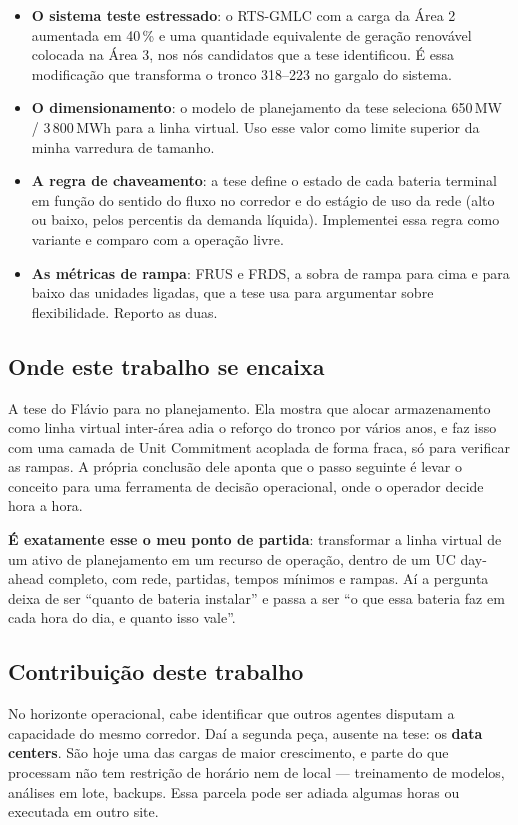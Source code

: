 \documentclass[11pt,a4paper]{article}
\begin{document}
\begin{itemize}
\item \textbf{O sistema teste estressado}: o RTS-GMLC com a carga da Área 2 aumentada em 40\,\% e uma
quantidade equivalente de geração renovável colocada na Área 3, nos nós candidatos que a tese identificou.
É essa modificação que transforma o tronco 318--223 no gargalo do sistema.
\item \textbf{O dimensionamento}: o modelo de planejamento da tese seleciona 650\,MW / 3\,800\,MWh para a
linha virtual. Uso esse valor como limite superior da minha varredura de tamanho.
\item \textbf{A regra de chaveamento}: a tese define o estado de cada bateria terminal em função do
sentido do fluxo no corredor e do estágio de uso da rede (alto ou baixo, pelos percentis da demanda
líquida). Implementei essa regra como variante e comparo com a operação livre.
\item \textbf{As métricas de rampa}: FRUS e FRDS, a sobra de rampa para cima e para baixo das unidades
ligadas, que a tese usa para argumentar sobre flexibilidade. Reporto as duas.
\end{itemize}

\subsection{Onde este trabalho se encaixa}

A tese do Flávio para no planejamento. Ela mostra que alocar armazenamento como linha virtual inter-área
adia o reforço do tronco por vários anos, e faz isso com uma camada de Unit Commitment acoplada de forma
fraca, só para verificar as rampas. A própria conclusão dele aponta que o passo seguinte é levar o
conceito para uma ferramenta de decisão operacional, onde o operador decide hora a hora.

\textbf{É exatamente esse o meu ponto de partida}: transformar a linha virtual de um ativo de planejamento
em um recurso de operação, dentro de um UC day-ahead completo, com rede, partidas, tempos mínimos e
rampas. Aí a pergunta deixa de ser ``quanto de bateria instalar'' e passa a ser ``o que essa bateria faz
em cada hora do dia, e quanto isso vale''.

\subsection{Contribuição deste trabalho}

No horizonte operacional, cabe identificar que outros agentes disputam a capacidade do mesmo corredor.
Daí a segunda peça, ausente na tese: os \textbf{data centers}. São hoje uma das cargas de maior
crescimento, e parte do que processam não tem restrição de horário nem de local --- treinamento de
modelos, análises em lote, backups. Essa parcela pode ser adiada algumas horas ou executada em outro
site.
\end{document}
